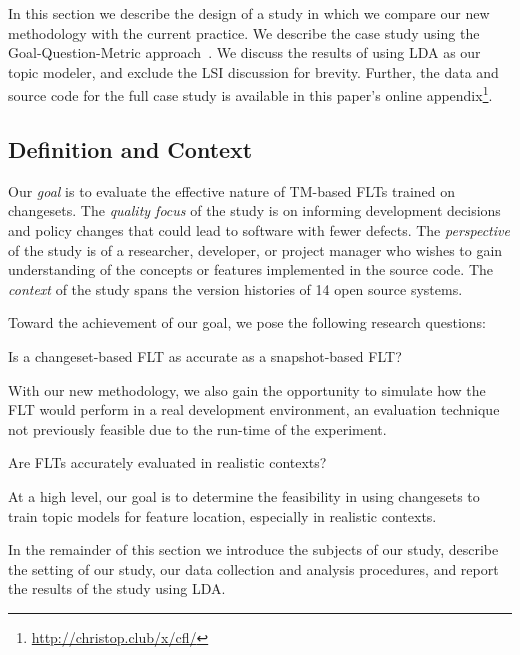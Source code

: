 
In this section we describe the design of a study in which we compare our new
methodology with the current practice. We describe the case study using the
Goal-Question-Metric approach~\cite{Basili-etal:94}.  We discuss the results of
using LDA as our topic modeler, and exclude the LSI discussion for brevity.
Further, the data and source code for the full case study is available in this
paper's online appendix\footnote{\url{http://christop.club/x/cfl/}}.

\subsection{Definition and Context}

Our \textit{goal} is to evaluate the effective nature of TM-based FLTs trained
on changesets.  The \textit{quality focus} of the study is on informing
development decisions and policy changes that could lead to software with fewer
defects.  The \textit{perspective} of the study is of a researcher, developer,
or project manager who wishes to gain understanding of the concepts or features
implemented in the source code.  The \textit{context} of the study spans the
version histories of 14 open source systems.

Toward the achievement of our goal, we pose the following research questions:
\begin{description}[font=\itshape\mdseries,leftmargin=10mm,style=sameline]
    \item[RQ1] Is a changeset-based FLT as accurate as a snapshot-based FLT?
\end{description}

With our new methodology, we also gain the opportunity to simulate how the FLT
would perform in a real development environment, an evaluation technique
not previously feasible due to the run-time of the experiment.

\begin{description}[font=\itshape\mdseries,leftmargin=10mm,style=sameline]
    \item[RQ2] Are FLTs accurately evaluated in realistic contexts?
\end{description}

At a high level, our goal is to determine the feasibility in using changesets
to train topic models for feature location, especially in realistic contexts.

In the remainder of this section we introduce the subjects of our study,
describe the setting of our study, our data collection and analysis procedures,
and report the results of the study using LDA.

